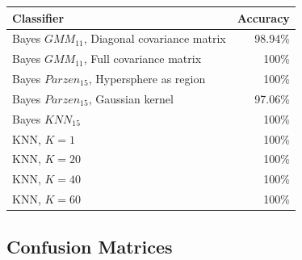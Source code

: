 \documentclass[a4paper]{article}
\begin{document}
\begin{tabular}{ | l | r | }
\hline
\textbf{Classifier} & \textbf{Accuracy} \\
\hline
Bayes $GMM_{11}$, Diagonal covariance matrix  &   98.94\% \\
Bayes $GMM_{11}$, Full covariance matrix      &   100\%   \\
\hline
Bayes $Parzen_{15}$, Hypersphere as region    &   100\%   \\
Bayes $Parzen_{15}$, Gaussian kernel          &   97.06\% \\
\hline
Bayes $KNN_15$                                &   100\%   \\
\hline
KNN, $K=1$                                    &   100\%   \\
KNN, $K=20$                                   &   100\%   \\
KNN, $K=40$                                   &   100\%   \\
KNN, $K=60$                                   &   100\%   \\
\hline
\end{tabular}


\subsection{Confusion Matrices}
\end{document}
